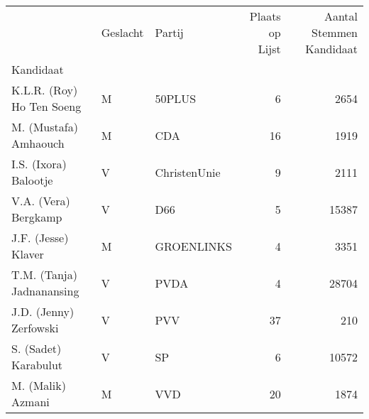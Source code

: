 \begin{tabular}{lllrr}
\toprule
{} & Geslacht &        Partij &  Plaats op Lijst &  Aantal Stemmen Kandidaat \\
Kandidaat                 &          &               &                  &                           \\
\midrule
K.L.R. (Roy) Ho Ten Soeng &        M &        50PLUS &                6 &                      2654 \\
M. (Mustafa) Amhaouch     &        M &           CDA &               16 &                      1919 \\
I.S. (Ixora) Balootje     &        V &  ChristenUnie &                9 &                      2111 \\
V.A. (Vera) Bergkamp      &        V &           D66 &                5 &                     15387 \\
J.F. (Jesse) Klaver       &        M &    GROENLINKS &                4 &                      3351 \\
T.M. (Tanja) Jadnanansing &        V &          PVDA &                4 &                     28704 \\
J.D. (Jenny) Zerfowski    &        V &           PVV &               37 &                       210 \\
S. (Sadet) Karabulut      &        V &            SP &                6 &                     10572 \\
M. (Malik) Azmani         &        M &           VVD &               20 &                      1874 \\
\bottomrule
\end{tabular}
